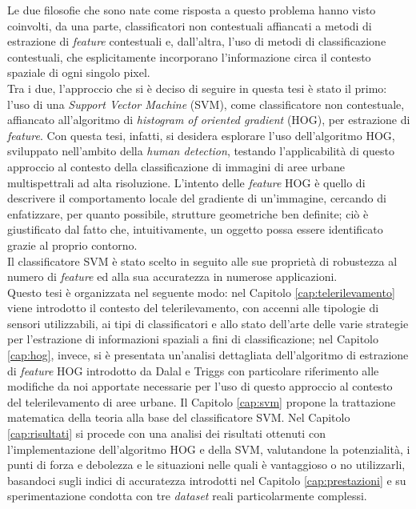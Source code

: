 Le due filosofie che sono nate come risposta a questo problema hanno visto coinvolti, da una parte, classificatori non contestuali affiancati a metodi di estrazione di \emph{feature} contestuali e, dall'altra, l'uso di metodi di classificazione contestuali, che esplicitamente incorporano l'informazione circa il contesto spaziale di ogni singolo pixel.\\
Tra i due, l'approccio che si è deciso di seguire in questa tesi è stato il primo: l'uso di una \emph{Support Vector Machine} (SVM), come classificatore non contestuale, affiancato all'algoritmo di \emph{histogram of oriented gradient} (HOG), per estrazione di \emph{feature}.
Con questa tesi, infatti, si desidera esplorare l'uso dell'algoritmo HOG, sviluppato nell'ambito della \emph{human detection}, testando l'applicabilità di questo approccio al contesto della classificazione di immagini di aree urbane multispettrali ad alta risoluzione. L'intento delle \emph{feature} HOG è quello di descrivere il comportamento locale del gradiente di un'immagine, cercando di enfatizzare, per quanto possibile, strutture geometriche ben definite; ciò è giustificato dal fatto che, intuitivamente, un oggetto possa essere identificato grazie al proprio contorno.\\
Il classificatore SVM è stato scelto in seguito alle sue proprietà di robustezza al numero di \emph{feature} ed alla sua accuratezza in numerose applicazioni.\\

Questo tesi è organizzata nel seguente modo: nel Capitolo \ref{cap:telerilevamento} viene introdotto il contesto del telerilevamento, con accenni alle tipologie di sensori utilizzabili, ai tipi di classificatori e allo stato dell'arte delle varie strategie per l'estrazione di informazioni spaziali a fini di classificazione; nel Capitolo \ref{cap:hog}, invece, si è presentata un'analisi dettagliata dell'algoritmo di estrazione di \emph{feature} HOG introdotto da Dalal e Triggs \citep{Art_HOGHuman} con particolare riferimento alle modifiche da noi apportate necessarie per l'uso di questo approccio al contesto del telerilevamento di aree urbane. Il Capitolo \ref{cap:svm} propone la trattazione matematica della teoria alla base del classificatore SVM.
Nel Capitolo \ref{cap:risultati} si procede con una analisi dei risultati ottenuti con l'implementazione dell'algoritmo HOG e della SVM, valutandone la potenzialità, i punti di forza e debolezza e le situazioni nelle quali è vantaggioso o no utilizzarli, basandoci sugli indici di accuratezza introdotti nel Capitolo \ref{cap:prestazioni} e su sperimentazione condotta con tre \emph{dataset} reali particolarmente complessi.





